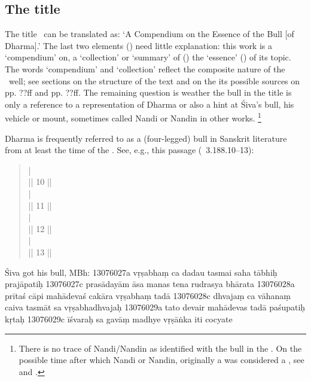 \documentclass[11pt]{book}
\begin{document}
\subsection{The title}
The title \Vss\ can be translated as:
`A Compendium on the Essence of the Bull [of Dharma].'
The last two elements () need
little explanation: this work is a 
`compendium' on, a `collection' or `summary' of ()
the `essence' () of its topic. The words 
`compendium' and `collection' reflect the composite nature of
the \Vss\ well; see sections on the structure of the text and
on the its possible sources on pp. ??ff and pp. ??ff.
The remaining question is weather the bull in the title 
is only a reference to a representation of Dharma 
or also a hint at Śiva's bull, his vehicle or mount, 
sometimes called Nandi or Nandin in other works.%
		\footnote{There is no trace of Nandi/Nandin
		as identified with the bull in the \Vss.
		On the possible time after which 
		Nandi or Nandin, originally a  
		was considered a , see 
		 and 
		.}

Dharma is frequently referred to as a (four-legged) 
bull in Sanskrit literature from at least the time of the \MBh. 
See, e.g., this passage (\MBH\ 3.188.10--13):

\begin{quote}
{\small
   |\\
   || 10 ||\\
   |\\
   || 11 ||\\
   |\\
   || 12 ||\\
   |\\
   || 13 ||\\
  }
\end{quote}

Śiva got his bull, MBh:
13076027a vṛṣabhaṃ ca dadau tasmai saha tābhiḥ prajāpatiḥ
13076027c prasādayām āsa manas tena rudrasya bhārata
13076028a prītaś cāpi mahādevaś cakāra vṛṣabhaṃ tadā
13076028c dhvajaṃ ca vāhanaṃ caiva tasmāt sa vṛṣabhadhvajaḥ
13076029a tato devair mahādevas tadā paśupatiḥ kṛtaḥ
13076029c īśvaraḥ sa gavāṃ madhye vṛṣāṅka iti cocyate
\end{document}
